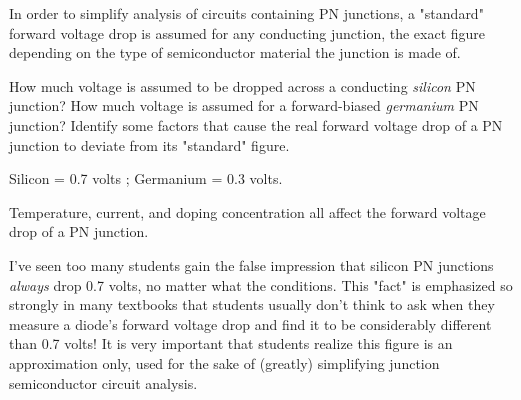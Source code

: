 

In order to simplify analysis of circuits containing PN junctions, a "standard" forward voltage drop is assumed for any conducting junction, the exact figure depending on the type of semiconductor material the junction is made of.

How much voltage is assumed to be dropped across a conducting {\it silicon} PN junction?  How much voltage is assumed for a forward-biased {\it germanium} PN junction?  Identify some factors that cause the real forward voltage drop of a PN junction to deviate from its "standard" figure.







Silicon = 0.7 volts ; Germanium = 0.3 volts.

\vskip 10pt

Temperature, current, and doping concentration all affect the forward voltage drop of a PN junction.







I've seen too many students gain the false impression that silicon PN junctions {\it always} drop 0.7 volts, no matter what the conditions.  This "fact" is emphasized so strongly in many textbooks that students usually don't think to ask when they measure a diode's forward voltage drop and find it to be considerably different than 0.7 volts!  It is very important that students realize this figure is an approximation only, used for the sake of (greatly) simplifying junction semiconductor circuit analysis.




